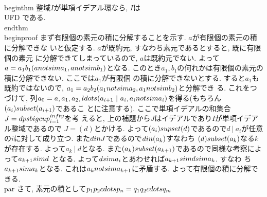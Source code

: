 \\begin{thm}
 整域$I$が単項イデアル環なら, $I$は\\UFD である.
\\end{thm}
\\begin{proof}
 まず有限個の素元の積に分解することを示す. $a$が有限個の素元の積に分解できな
 いと仮定する. $a$が既約元, すなわち素元であるとすると, 既に有限個の素元
 に分解できてしまっているので, $a$は既約元でない. よって
 $a=a_{1}b_{1}(a\\not\\sim a_{1}, a\\not\\sim b_{1})$となる. このとき$a_{1},
 b_{1}$の何れかは有限個の素元の積に分解できない. ここでは$a_{1}$が有限個
 の積に分解できないとする. すると$a_{1}$も既約ではないので,
 $a_{1}=a_{2}b_{2}(a_{1}\\not\\sim a_{2}, a_{1}\\not\\sim b_{2})$と分解でき
 る. これをつづけて, 列$a_{0}=a, a_{1}, a_{2},\\ldots(a_{i+1}~|~a_{i},
 a_{i}\\not\\sim a_{i})$を得る(もちろん$(a_{i})\\subset (a_{i+1})$であるこ
 とに注意する). ここで単項イデアルの和集合$J=\\dps\\bigcup_{i=1}^{\\infty}$を考
 えると, 上の補題から$J$はイデアルであり$I$が単項イデアル整域であるので
 $J=(d)$とかける. よって$(a_{i})\\supset (d)$であるので$d~|~a_{i}$が任意
 の$i$に対して成り立つ. また$d\\in J$であるので$d\\in (a_{k})$すなわち
 $(d)\\subset (a_{k})$なる$k$が存在する. よって$a_{k}~|~d$となる.
 また$(a_{k})\\subset (a_{k+1})$であるので同様な考察によって$a_{k+1}\\sim d$
 となる. よって$d\\sim a_{i}$とあわせれば$a_{k+1}\\sim d\\sim a_{k}$. すなわ
 ち$a_{k+1}\\sim a_{k}$となる. これは$a_{k}\\not\\sim a_{k+1}$に矛盾する.
 よって有限個の積に分解できる.
\\par さて, 素元の積として$p_{1}p_{2}\\cdots p_{n}=q_{1}q_{2}\\cdots q_{m}$
